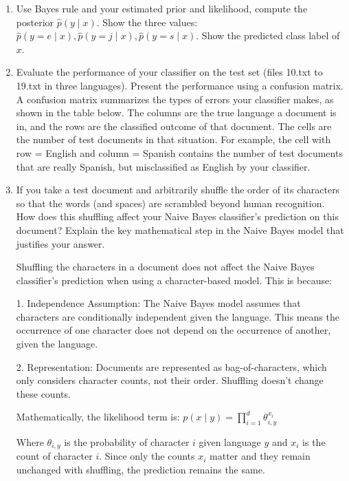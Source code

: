 \documentclass[a4paper]{article}
\theoremstyle{definition}
\newenvironment{soln}{
    \leavevmode\color{blue}\ignorespaces
}{}
\begin{document}
\begin{enumerate}
\item
Use Bayes rule and your estimated prior and likelihood, compute the posterior $\hat p(y \mid x)$.
Show the three values: $\hat p(y=e \mid x), \hat p(y=j \mid x), \hat p(y=s \mid x)$.
Show the predicted class label of $x$.


\item
Evaluate the performance of your classifier on the test set (files 10.txt to 19.txt in three languages).
Present the performance using a confusion matrix. A confusion matrix summarizes the types of errors your classifier makes, as shown in the table below.   The columns are the true language a document is in, and the rows are the classified outcome of that document.  The cells are the number of test documents in that situation.  For example, the cell with row = English and column = Spanish contains the number of test documents that are really Spanish, but misclassified as English by your classifier.

\item If you take a test document and arbitrarily shuffle the order of its characters so that the words (and spaces) are scrambled beyond human recognition.  How does this shuffling affect your Naive Bayes classifier's prediction on this document?  Explain the key mathematical step in the Naive Bayes model that justifies your answer.

\begin{soln}
Shuffling the characters in a document does not affect the Naive Bayes classifier's prediction when using a character-based model. This is because:
    
1. Independence Assumption: The Naive Bayes model assumes that characters are conditionally independent given the language. This means the occurrence of one character does not depend on the occurrence of another, given the language.
    
2. Representation: Documents are represented as bag-of-characters, which only considers character counts, not their order. Shuffling doesn't change these counts.
    
Mathematically, the likelihood term is:
$p(x \mid y) = \prod_{i=1}^{d} \theta_{i, y}^{x_i}$

Where $\theta_{i, y}$ is the probability of character $i$ given language $y$ and $x_i$ is the count of character $i$. Since only the counts $x_i$ matter and they remain unchanged with shuffling, the prediction remains the same.
\end{soln}

\end{enumerate}
\end{document}
